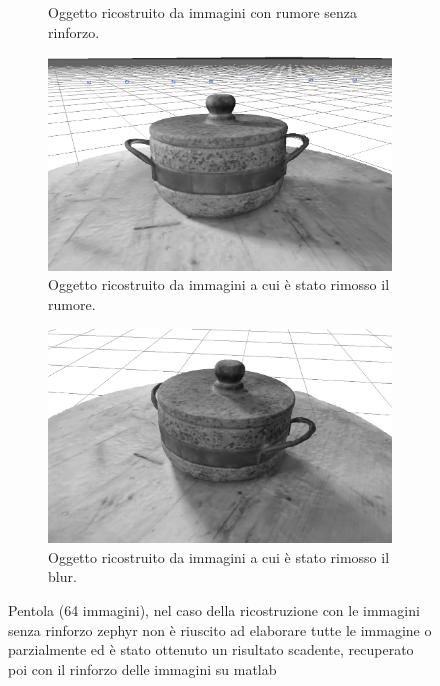 \documentclass[12pt]{report}
\begin{document}
\begin{figure}[H]
\begin{subfigure}[b]{0.45\linewidth}
    \captionsetup{justification=centering}
    \caption{Oggetto ricostruito da immagini con rumore senza rinforzo.}
  \end{subfigure}
  \begin{subfigure}[b]{0.45\linewidth}
    \centering
    \includegraphics[width=\linewidth]{img/pentola/oggetto_grayscale.png} %
    \captionsetup{justification=centering}
    \caption{Oggetto ricostruito da immagini a cui \`e stato rimosso il rumore.}
  \end{subfigure}
  \begin{subfigure}[b]{0.45\linewidth}
    \centering
    \includegraphics[width=\linewidth]{img/pentola/oggetto_deblurred.png}
    \captionsetup{justification=centering}
    \caption{Oggetto ricostruito da immagini a cui \`e stato rimosso il blur.}
  \end{subfigure}
  \captionsetup{justification=centering}
  \caption{Pentola (64 immagini), nel caso della ricostruzione con le immagini senza rinforzo zephyr non \`e riuscito ad elaborare tutte le immagine o parzialmente ed \`e stato ottenuto un risultato scadente, recuperato poi con il rinforzo delle immagini su matlab}
\end{figure}
\end{document}
